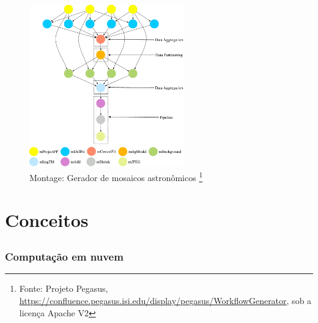 \documentclass{beamer}
\begin{document}
\begin{frame}
\frametitle{}

\begin{figure}[htp]
\begin{center}
  \includegraphics[height=7cm]{Montage.jpg}
  \caption[map]{Montage: Gerador de mosaicos astronômicos \footnote{\tiny
  Fonte: Projeto Pegasus, \url{https://confluence.pegasus.isi.edu/display/pegasus/WorkflowGenerator},
  sob a licença Apache V2}}
\end{center}
\end{figure}


\end{frame}


\section{Conceitos}
\subsection{}

\begin{frame}
\frametitle{Computação em nuvem}
\end{frame}
\end{document}
